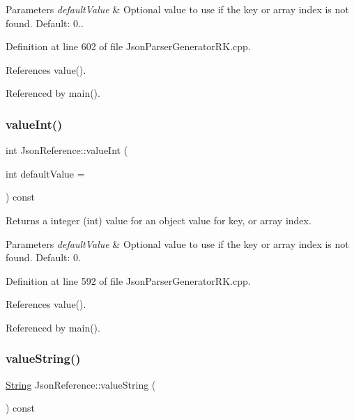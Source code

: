 \begin{DoxyParams}{Parameters}
{\em default\+Value} & Optional value to use if the key or array index is not found. Default\+: 0.. \\
\hline
\end{DoxyParams}


Definition at line 602 of file Json\+Parser\+Generator\+R\+K.\+cpp.



References value().



Referenced by main().

\mbox{\label{class_json_reference_afcf4b05a4b789ca1ea938a1adb33cafa}} 
\subsubsection{\texorpdfstring{value\+Int()}{valueInt()}}
{\footnotesize\ttfamily int Json\+Reference\+::value\+Int (\begin{DoxyParamCaption}\item[{int}]{default\+Value = {} }\end{DoxyParamCaption}) const}



Returns a integer (int) value for an object value for key, or array index. 


\begin{DoxyParams}{Parameters}
{\em default\+Value} & Optional value to use if the key or array index is not found. Default\+: 0. \\
\hline
\end{DoxyParams}


Definition at line 592 of file Json\+Parser\+Generator\+R\+K.\+cpp.



References value().



Referenced by main().

\mbox{\label{class_json_reference_ab9dfec23570193b9ab1d16b07fba6022}} 
\subsubsection{\texorpdfstring{value\+String()}{valueString()}}
{\footnotesize\ttfamily \hyperlink{class_string}{String} Json\+Reference\+::value\+String (\begin{DoxyParamCaption}{ }\end{DoxyParamCaption}) const}



